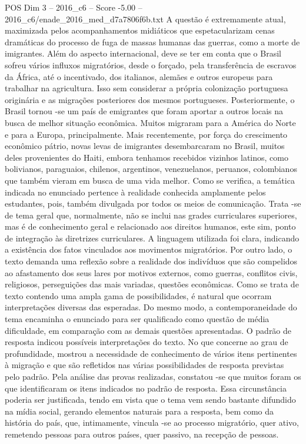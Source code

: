 \begin{textsample}{POS Dim 3 – 2016\_c6 – Score -5.00 – 2016\_c6/enade\_2016\_med\_d7a7806f6b.txt}
A questão é extremamente atual, maximizada pelos acompanhamentos midiáticos que espetacularizam cenas dramáticas do processo de fuga de massas humanas das guerras, como a morte de imigrantes.
Além do aspecto internacional, deve se ter em conta que o Brasil sofreu vários influxos migratórios, desde o forçado, pela transferência de escravos da África, até o incentivado, dos italianos, alemães e outros europeus para trabalhar na agricultura.
Isso sem considerar a própria colonização portuguesa originária e as migrações posteriores dos mesmos portugueses.
Posteriormente, o Brasil tornou -se um país de emigrantes que foram aportar a outros locais na busca de melhor situação econômica.
Muitos migraram para a América do Norte e para a Europa, principalmente.
Mais recentemente, por força do crescimento econômico pátrio, novas levas de imigrantes desembarcaram no Brasil, muitos deles provenientes do Haiti, embora tenhamos recebidos vizinhos latinos, como bolivianos, paraguaios, chilenos, argentinos, venezuelanos, peruanos, colombianos que também vieram em busca de uma vida melhor.
Como se verifica, a temática indicada no enunciado pertence à realidade conhecida amplamente pelos estudantes, pois, também divulgada por todos os meios de comunicação.
Trata -se de tema geral que, normalmente, não se inclui nas grades curriculares superiores, mas é de conhecimento geral e relacionado aos direitos humanos, este sim, ponto de integração às diretrizes curriculares.
A linguagem utilizada foi clara, indicando a existência dos fatos vinculados aos movimentos migratórios.
Por outro lado, o texto demanda uma reflexão sobre a realidade dos indivíduos que são compelidos ao afastamento dos seus lares por motivos externos, como guerras, conflitos civis, religiosos, perseguições das mais variadas, questões econômicas.
Como se trata de texto contendo uma ampla gama de possibilidades, é natural que ocorram interpretações diversas das esperadas.
Do mesmo modo, a contemporaneidade do tema encaminha o enunciado para ser qualificado como questão de média dificuldade, em comparação com as demais questões apresentadas.
O padrão de resposta indicou possíveis interpretações do texto.
No que concerne ao grau de profundidade, mostrou a necessidade de conhecimento de vários itens pertinentes à migração e que são refletidos nas várias possibilidades de resposta previstas pelo padrão.
Pela análise das provas realizadas, constatou -se que muitos foram os que identificaram os itens indicados no padrão de resposta.
Essa circunstância poderia ser justificada, tendo em vista que o tema vem sendo bastante difundido na mídia social, gerando elementos naturais para a resposta, bem como da história do país, que, intimamente, vincula -se ao processo migratório, quer ativo, remetendo pessoas para outros países, quer passivo, na recepção de pessoas.

\end{textsample}
